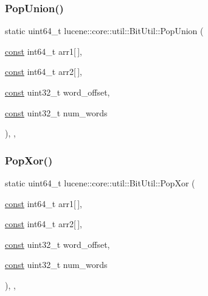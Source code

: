 \mbox{\label{classlucene_1_1core_1_1util_1_1BitUtil_ac52c26353a131f7cb71b4e6dd68e7059}} 
\subsubsection{\texorpdfstring{Pop\+Union()}{PopUnion()}}
{\footnotesize\ttfamily static uint64\+\_\+t lucene\+::core\+::util\+::\+Bit\+Util\+::\+Pop\+Union (\begin{DoxyParamCaption}\item[{\mbox{\hyperlink{ZlibCrc32_8h_a2c212835823e3c54a8ab6d95c652660e}{const}} int64\+\_\+t}]{arr1\mbox{[}$\,$\mbox{]},  }\item[{\mbox{\hyperlink{ZlibCrc32_8h_a2c212835823e3c54a8ab6d95c652660e}{const}} int64\+\_\+t}]{arr2\mbox{[}$\,$\mbox{]},  }\item[{\mbox{\hyperlink{ZlibCrc32_8h_a2c212835823e3c54a8ab6d95c652660e}{const}} uint32\+\_\+t}]{word\+\_\+offset,  }\item[{\mbox{\hyperlink{ZlibCrc32_8h_a2c212835823e3c54a8ab6d95c652660e}{const}} uint32\+\_\+t}]{num\+\_\+words }\end{DoxyParamCaption})\hspace{0.3cm}{\ttfamily [inline]}, {\ttfamily [static]}, {\ttfamily [noexcept]}}

\mbox{\label{classlucene_1_1core_1_1util_1_1BitUtil_ae7893c706c1b8e661bdf23a5fc4b9a2a}} 
\subsubsection{\texorpdfstring{Pop\+Xor()}{PopXor()}}
{\footnotesize\ttfamily static uint64\+\_\+t lucene\+::core\+::util\+::\+Bit\+Util\+::\+Pop\+Xor (\begin{DoxyParamCaption}\item[{\mbox{\hyperlink{ZlibCrc32_8h_a2c212835823e3c54a8ab6d95c652660e}{const}} int64\+\_\+t}]{arr1\mbox{[}$\,$\mbox{]},  }\item[{\mbox{\hyperlink{ZlibCrc32_8h_a2c212835823e3c54a8ab6d95c652660e}{const}} int64\+\_\+t}]{arr2\mbox{[}$\,$\mbox{]},  }\item[{\mbox{\hyperlink{ZlibCrc32_8h_a2c212835823e3c54a8ab6d95c652660e}{const}} uint32\+\_\+t}]{word\+\_\+offset,  }\item[{\mbox{\hyperlink{ZlibCrc32_8h_a2c212835823e3c54a8ab6d95c652660e}{const}} uint32\+\_\+t}]{num\+\_\+words }\end{DoxyParamCaption})\hspace{0.3cm}{\ttfamily [inline]}, {\ttfamily [static]}, {\ttfamily [noexcept]}}

